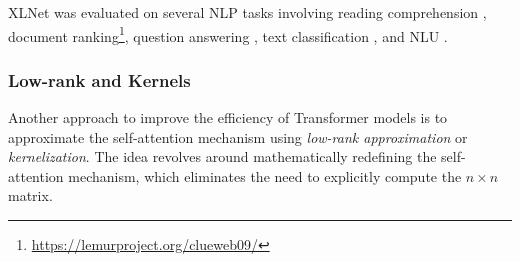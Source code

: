 XLNet was evaluated on several \ac{NLP} tasks involving reading comprehension \citep{lai2017race}, document ranking\footnote{\url{https://lemurproject.org/clueweb09/}}, question answering \citep{rajpurkar2016squad}, text classification \citep{maas2011learning, zhang2015character}, and \ac{NLU} \citep{wang2018glue}.




\subsubsection{Low-rank and Kernels}

Another approach to improve the efficiency of Transformer models is to approximate the self-attention mechanism using \textit{low-rank approximation} or \textit{kernelization}. The idea revolves around mathematically redefining the self-attention mechanism, which eliminates the need to explicitly compute the $n \times n$ matrix.

